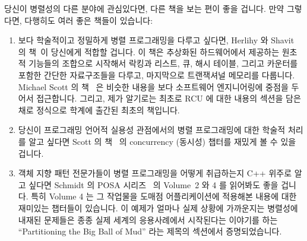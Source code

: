당신이 병렬성의 다른 분야에 관심있다면, 다른 책을 보는 편이 좋을 겁니다.
만약 그렇다면, 다행히도 여러 좋은 책들이 있습니다:

\iffalse
If you are interested in other aspects of parallelism, you might well
be better served by some other book.
Fortunately, there are many alternatives available to you:
\fi

\begin{enumerate}
\item	보다 학술적이고 정밀하게 병렬 프로그래밍을 다루고 싶다면, Herlihy 와
	Shavit 의 책~\cite{HerlihyShavit2008Textbook}이 당신에게 적합할 겁니다.
	이 책은 추상화된 하드웨어에서 제공하는 원초적 기능들의 조합으로
	시작해서 락킹과 리스트, 큐, 해시 테이블, 그리고 카운터를 포함한 간단한
	자료구조들을 다루고, 마지막으로 트랜잭셔널 메모리를 다룹니다.  Michael
	Scott 의 책~\cite{MichaelScott2013Textbook} 은 비슷한 내용을 보다
	소프트웨어 엔지니어링에 중점을 두어서 접근합니다. 그리고, 제가 알기로는
	최초로 RCU 에 대한 내용의 섹션을 담은 채로 정식으로 학계에 출간된
	최초의 책입니다.

\iffalse
\item	If you prefer a more academic and rigorous treatment of
	parallel programming,
	you might like Herlihy's and Shavit's
	textbook~\cite{HerlihyShavit2008Textbook}.
	This book starts with an interesting combination
	of low-level primitives at high levels of abstraction
	from the hardware, and works its way through locking
	and simple data structures including lists, queues,
	hash tables, and counters, culminating with transactional
	memory.
	Michael Scott's textbook~\cite{MichaelScott2013Textbook}
	approaches similar material with more of a
	software-engineering focus, and, as far as I know, is
	the first formally published academic textbook to include a
	section devoted to RCU.
\fi

\item	당신이 프로그래밍 언어적 실용성 관점에서의 병렬 프로그래밍에 대한
	학술적 처리를 알고 싶다면 Scott 의 책~\cite{MichaelScott2006Textbook}
	의 concurrency (동시성) 챕터를 재밌게 볼 수 있을 겁니다.

\iffalse
\item	If you would like an academic treatment of parallel
	programming from a programming-language-pragmatics viewpoint,
	you might be interested in the concurrency chapter from Scott's
	textbook~\cite{MichaelScott2006Textbook}
	on programming-language pragmatics.
\fi

\item	객체 지향 패턴 전문가들이 병렬 프로그래밍을 어떻게 취급하는지 C++
	위주로 알고 싶다면 Schmidt 의 POSA
	시리즈~\cite{SchmidtStalRohnertBuschmann2000v2Textbook,
	BuschmannHenneySchmidt2007v4Textbook} 의 Volume~2 와 4 를 읽어봐도 좋을
	겁니다.  특히 Volume 4 는 그 작업물을 도매점 어플리케이션에 적용해본
	내용에 대한 재미있는 챕터들이 있습니다.  이 예제가 얼마나 실제 상황에
	가까운지는 병렬성에 내재된 문제들은 종종 실제 세계의 응용사례에서
	시작된다는 이야기를 하는 ``Partitioning the Big Ball of Mud'' 라는
	제목의 섹션에서 증명되었습니다.


\end{enumerate}
